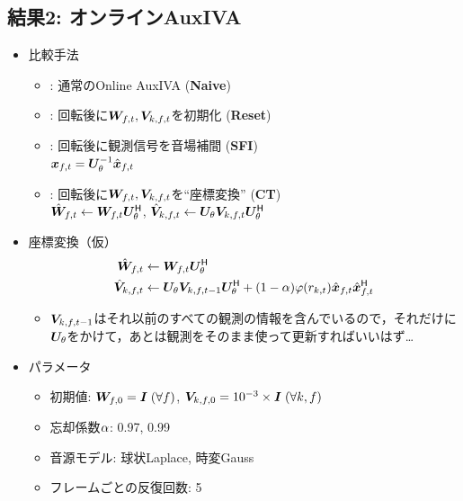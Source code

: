 \documentclass[twocolumn,9pt,dvipdfmx]{article}
\begin{document}
\clearpage\newpage
\subsection*{結果2: オンラインAuxIVA}
\begin{itemize}
  \item 比較手法
    \begin{itemize}
      \item {}: 通常のOnline AuxIVA (\textbf{Naive})
      \item {}: 回転後に$\Demix _{\ft}, \cov _{\src,\ft}$を初期化 (\textbf{Reset})
      \item {}: 回転後に観測信号を音場補間 (\textbf{SFI})\\
        $\Obs _{\ft} = \rotMat _{\rotDeg} ^{-1} \rotObs _{\ft}$
      \item {}: 回転後に$\Demix _{\ft}, \cov _{\src,\ft}$を``座標変換'' (\textbf{CT})\\
        $\rotDemix _{\ft} \gets \Demix _{\ft} \rotMat _{\rotDeg} ^{\hermite}$,\; $\rotCov _{\src,\ft} \gets \rotMat _{\rotDeg} \cov _{\src,\ft} \rotMat _{\rotDeg} ^{\hermite}$
    \end{itemize}
  \item 座標変換（仮）
    \begin{align*}
      \rotDemix _{\ft} &\gets \Demix _{\ft} \rotMat _{\rotDeg} ^{\hermite} \\
      \rotCov _{\src,\ft} &\gets \rotMat _{\rotDeg} \cov _{\src,\ft[-1]} \rotMat _{\rotDeg} ^{\hermite} + (1 - \forget) \weight(\var _{\src,\tframe}) \rot{\Obs} _{\ft} \rot{\Obs} _{\ft} ^{\hermite}
    \end{align*}
    \begin{itemize}
      \item $\cov _{\src,\ft[-1]}$はそれ以前のすべての観測の情報を含んでいるので，それだけに$\bm{U} _{\theta}$をかけて，あとは観測をそのまま使って更新すればいいはず…
    \end{itemize}
  \item パラメータ
    \begin{itemize}
      \item 初期値: $\bm{W} _{f,0} = \bm{I}\; (\forall f)$, $\bm{V} _{k,f,0} = 10^{-3}\times\bm{I}\; (\forall k, f)$
      \item 忘却係数$\alpha$: 0.97, 0.99
      \item 音源モデル: 球状Laplace, 時変Gauss
      \item フレームごとの反復回数: 5
    \end{itemize}
\end{itemize}
\end{document}
